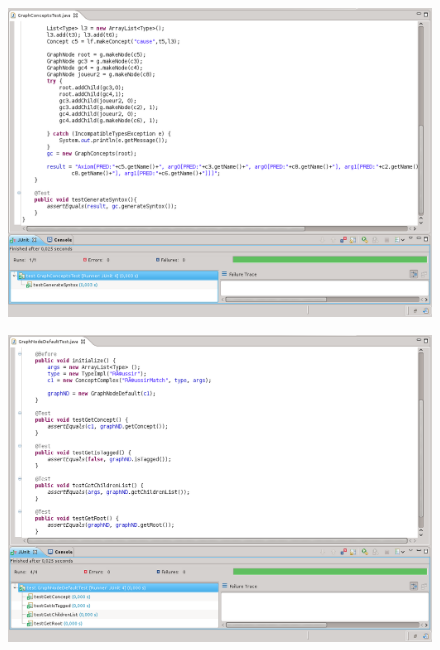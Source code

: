\documentclass[12pt]{report}
\begin{document}
\begin{figure}[h!]
\begin{center}
	\includegraphics[scale=0.40]{resultatTest2.png}
\end{center}
\end{figure}
\begin{figure}[h!]
\begin{center}
	\includegraphics[scale=0.40]{resultatTest3.png}
\end{center}
\end{figure}
\newpage
\end{document}
